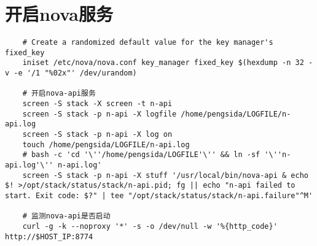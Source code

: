 \documentclass[a4paper,left=1.5cm,right=1.5cm,11pt]{article}
\begin{document}
\section{开启nova服务}
	\begin{lstlisting}
	# Create a randomized default value for the key manager's fixed_key
	iniset /etc/nova/nova.conf key_manager fixed_key $(hexdump -n 32 -v -e '/1 "%02x"' /dev/urandom)

	# 开启nova-api服务
	screen -S stack -X screen -t n-api
	screen -S stack -p n-api -X logfile /home/pengsida/LOGFILE/n-api.log
    screen -S stack -p n-api -X log on
	touch /home/pengsida/LOGFILE/n-api.log
    # bash -c 'cd '\''/home/pengsida/LOGFILE'\'' && ln -sf '\''n-api.log'\'' n-api.log'
	screen -S stack -p n-api -X stuff '/usr/local/bin/nova-api & echo $! >/opt/stack/status/stack/n-api.pid; fg || echo "n-api failed to start. Exit code: $?" | tee "/opt/stack/status/stack/n-api.failure"^M'

	# 监测nova-api是否启动
	curl -g -k --noproxy '*' -s -o /dev/null -w '%{http_code}' http://$HOST_IP:8774
	\end{lstlisting}
\end{document}
